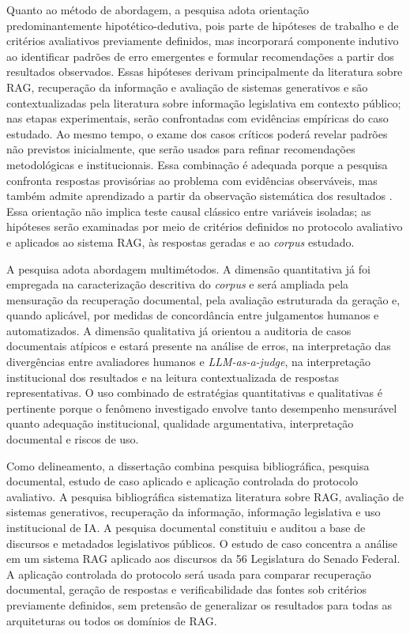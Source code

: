 Quanto ao método de abordagem, a pesquisa adota orientação predominantemente hipotético-dedutiva, pois parte de hipóteses de trabalho e de critérios avaliativos previamente definidos, mas incorporará componente indutivo ao identificar padrões de erro emergentes e formular recomendações a partir dos resultados observados. Essas hipóteses derivam principalmente da literatura sobre RAG, recuperação da informação e avaliação de sistemas generativos e são contextualizadas pela literatura sobre informação legislativa em contexto público; nas etapas experimentais, serão confrontadas com evidências empíricas do caso estudado. Ao mesmo tempo, o exame dos casos críticos poderá revelar padrões não previstos inicialmente, que serão usados para refinar recomendações metodológicas e institucionais. Essa combinação é adequada porque a pesquisa confronta respostas provisórias ao problema com evidências observáveis, mas também admite aprendizado a partir da observação sistemática dos resultados \parencite{lakatosMarconi2021metodologia}. Essa orientação não implica teste causal clássico entre variáveis isoladas; as hipóteses serão examinadas por meio de critérios definidos no protocolo avaliativo e aplicados ao sistema RAG, às respostas geradas e ao \textit{corpus} estudado.

A pesquisa adota abordagem multimétodos. A dimensão quantitativa já foi empregada na caracterização descritiva do \textit{corpus} e será ampliada pela mensuração da recuperação documental, pela avaliação estruturada da geração e, quando aplicável, por medidas de concordância entre julgamentos humanos e automatizados. A dimensão qualitativa já orientou a auditoria de casos documentais atípicos e estará presente na análise de erros, na interpretação das divergências entre avaliadores humanos e \textit{LLM-as-a-judge}, na interpretação institucional dos resultados e na leitura contextualizada de respostas representativas. O uso combinado de estratégias quantitativas e qualitativas é pertinente porque o fenômeno investigado envolve tanto desempenho mensurável quanto adequação institucional, qualidade argumentativa, interpretação documental e riscos de uso.

Como delineamento, a dissertação combina pesquisa bibliográfica, pesquisa documental, estudo de caso aplicado e aplicação controlada do protocolo avaliativo. A pesquisa bibliográfica sistematiza literatura sobre RAG, avaliação de sistemas generativos, recuperação da informação, informação legislativa e uso institucional de IA. A pesquisa documental constituiu e auditou a base de discursos e metadados legislativos públicos. O estudo de caso concentra a análise em um sistema RAG aplicado aos discursos da 56\textordfeminine{} Legislatura do Senado Federal. A aplicação controlada do protocolo será usada para comparar recuperação documental, geração de respostas e verificabilidade das fontes sob critérios previamente definidos, sem pretensão de generalizar os resultados para todas as arquiteturas ou todos os domínios de RAG.

